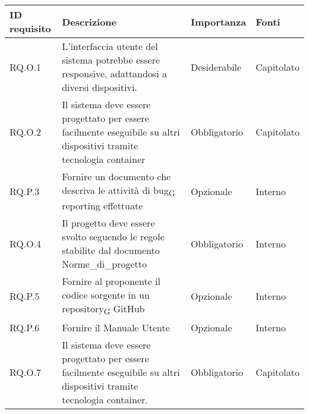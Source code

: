 \begin{longtable}{|C{2.7cm}|L{7.2cm}|C{2.7cm}|C{2cm}|}
        \hline
        \textbf{ID requisito} & \textbf{Descrizione} & \textbf{Importanza} & \textbf{Fonti}  \\
        \hline
       
        \hline
        RQ.O.1 & L'interfaccia utente del sistema potrebbe essere responsive, adattandosi a diversi dispositivi. & Desiderabile & Capitolato \\
        \hline
        RQ.O.2 & Il sistema deve essere progettato per essere facilmente eseguibile su altri dispositivi tramite tecnologia container & Obbligatorio & Capitolato \\
        
        \hline
        RQ.P.3 & Fornire un documento che descriva le attività di bug\textsubscript{G} reporting effettuate & Opzionale & Interno \\
        \hline
        RQ.O.4 & Il progetto deve essere svolto seguendo le regole stabilite dal documento Norme\_di\_progetto & Obbligatorio & Interno \\
        \hline
        RQ.P.5 & Fornire al proponente il codice sorgente in un
        repository\textsubscript{G} GitHub & Opzionale & Interno \\
        \hline
        RQ.P.6 & Fornire il Manuale Utente & Opzionale & Interno \\
        \hline
        RQ.O.7 & Il sistema deve essere progettato per essere facilmente eseguibile su altri dispositivi tramite tecnologia container. & Obbligatorio & Capitolato \\
        \hline
        
        


\end{longtable}